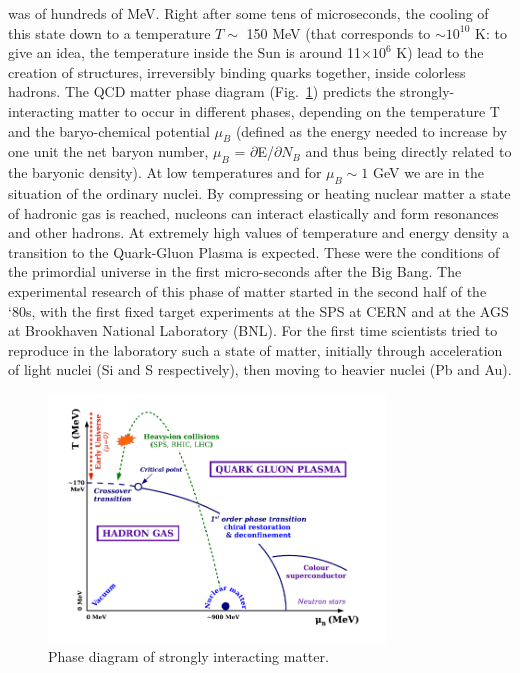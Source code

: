 was of hundreds of MeV.
Right after some tens of microseconds, the cooling of this state down to 
a temperature $T \sim$ 150 MeV (that corresponds to $\sim 10^{10}$ K: to give an idea, the temperature inside the Sun is 
around 11$\times 10^{6}$ K) lead to the 
creation of structures, irreversibly binding quarks together, inside colorless
hadrons. The QCD matter phase diagram (Fig.~\ref{fig:QCDphase}) predicts the 
strongly-interacting matter to occur in different phases, depending on the 
temperature T and the baryo-chemical potential $\mu_{B}$ (defined as 
the energy needed to increase by one unit the net baryon number, 
$\mu_{B}$ = $\partial$E/$\partial N_B$ and thus being directly related to the baryonic density). 
At low temperatures and for $\mu_{B} \sim 1$ GeV we are in the situation of the 
ordinary nuclei. By compressing or heating nuclear matter a state of 
hadronic gas is reached, nucleons can interact elastically and form resonances and other hadrons. 
At extremely high values of temperature and energy density a transition to the Quark-Gluon 
Plasma is expected. These were the conditions of the primordial universe in the
first micro-seconds after the Big Bang.
The experimental research of this phase of matter started in the second half of the `80s, 
with the first fixed target experiments at the SPS at CERN and at the AGS at 
Brookhaven National Laboratory (BNL). For the first time scientists tried to 
reproduce in the laboratory such a state of matter, initially through acceleration 
of light nuclei (Si and S respectively), then moving to heavier nuclei (Pb and Au).\\


\begin{figure}[h!]
\centering
 \includegraphics[width=0.8\textwidth] {FigCap1/QCDphase.jpeg}
\caption{Phase diagram of strongly interacting matter.}
\label{fig:QCDphase}
\end{figure}


